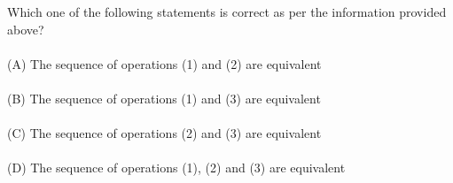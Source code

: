 \documentclass{book}[200pt]
\begin{document}
{	  
	  
	   
	   Which one of the following statements is correct as per the information
	   provided above?\\
	   \\
	   (A) The sequence of operations (1) and (2) are equivalent\\
	   \\
	   (B) The sequence of operations (1) and (3) are equivalent\\
	   \\
	   (C) The sequence of operations (2) and (3) are equivalent\\
	   \\
	   (D) The sequence of operations (1), (2) and (3) are equivalent\\
	   \\
	   \\
	   \\
	   \\
	   \\
	   \\
	   \\
	   \\
	   \\
	   \pagebreak\\
	   \\
	   \\
	   
	   \\
	   \\
	   \\
	   \\
	   \\
	   
}
\end{document}
